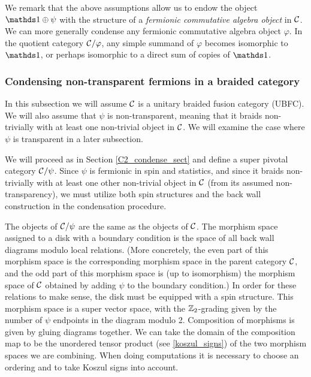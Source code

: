 We remark that the above assumptions allow us to endow the object $\unit\oplus\psi$ 
with the structure of a {\it fermionic commutative algebra object} in $\mathcal{C}$.
We can more generally condense any fermionic commutative algebra object $\varphi$.
In the quotient category $\mathcal{C}/\varphi$, any simple summand of $\varphi$ becomes isomorphic to $\unit$,
or perhaps isomorphic to a direct sum of copies of $\unit$.



\subsubsection{Condensing non-transparent fermions in a braided category}  \label{gntf_condense}


In this subsection we will assume $\mathcal{C}$ is a unitary braided fusion category (UBFC).
We will also assume that $\psi$ is non-transparent, meaning that it braids non-trivially with at least one non-trivial object in $\mathcal{C}$. 
We will examine the case where $\psi$ is transparent in a later subsection. 


We will proceed 
as in Section \ref{C2_condense_sect} and define a super pivotal category $\mathcal{C}/\psi$. 
Since $\psi$ is fermionic in spin and statistics, and since it braids non-trivially with 
at least one other non-trivial object in $\mathcal{C}$ (from its assumed non-transparency), we
must utilize both spin structures and the back wall construction in the condensation 
procedure. 

The objects of $\mathcal{C}/\psi$ are the same as the objects of $\mathcal{C}$.
The morphism space assigned to a disk with a boundary condition is the space of all back wall diagrams
modulo local relations.
(More concretely, the even part of this morphism space is the corresponding morphism space in the parent category $\mathcal{C}$,
and the odd part of this morphism space is (up to isomorphism) the morphism space of $\mathcal{C}$ 
obtained by adding $\psi$ to the boundary condition.)
In order for these relations to make sense, the disk must be equipped with a spin structure.
This morphism space is a super vector space, with the $\mathbb{Z}_2$-grading given by the number of $\psi$ endpoints in the diagram modulo 2.
Composition of morphisms is given by gluing diagrams together.
We can take the domain of the composition map to be the unordered tensor product (see \ref{koszul_signs})
of the two morphism spaces we are combining.
When doing computations it is necessary to choose an ordering and to take Koszul signs into account.




